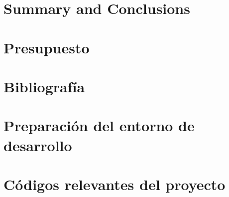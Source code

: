 \documentclass[spanish,a4paper,12pt,twoside,openright]{extreport}
\begin{document}
\chapter{\LARGE Summary and Conclusions}
\label{chapter:Conclusiones}



\newpage{\pagestyle{empty}}
\thispagestyle{empty}

\chapter{\LARGE Presupuesto}
\label{chapter:presupuesto}



\newpage{\pagestyle{empty}}
\thispagestyle{empty}

\chapter{\LARGE Bibliografía}
\label{chapter:Bibliografía}






\newpage{\pagestyle{empty}\cleardoublepage}
\thispagestyle{empty}

\begin{appendix}

\chapter{\LARGE Preparación del entorno de desarrollo}
\label{appendix:1}








\chapter{\LARGE Códigos relevantes del proyecto}
\label{appendix:2}


\end{appendix}
\end{document}
